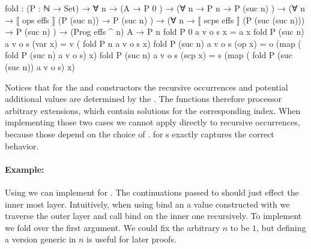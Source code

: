 \begin{code}
fold : (P : ℕ → Set) → ∀ n →
  (A                                           → P 0        )  →
  (∀ {n} → P n                                 → P (suc n)  )  →
  (∀ {n} → ⟦ ops   effs  ⟧  (P (suc n))        → P (suc n)  )  →
  (∀ {n} → ⟦ scps  effs  ⟧  (P (suc (suc n)))  → P (suc n)  )  →
  (Prog effs ^ n) A → P n
fold P 0        a v o s x         = a  x
fold P (suc n)  a v o s (var  x)  = v  (       fold P n              a v o s   x)
fold P (suc n)  a v o s (op   x)  = o  (map (  fold P (suc n)        a v o s)  x)
fold P (suc n)  a v o s (scp  x)  = s  (map (  fold P (suc (suc n))  a v o s)  x)
\end{code}
Notices that for the  and
 constructors the recursive occurrences and
potential additional values are determined by the .
The functions therefore processor arbitrary  extensions,
which contain solutions for the corresponding index.
When implementing those two cases we cannot apply  directly
to recursive occurrences, because those depend on the choice of
.
 for s exactly captures the correct
behavior.

\paragraph{Example: \bind{}}
Using  we can implement \AgdaFunction{>>=} for
\AgdaSpace{}\AgdaSpace{}.
The continuations  passed to \AgdaFunction{>>=} should just
effect the inner most layer.
Intuitively, when using bind an a value constructed with
 we traverse the outer layer and call bind on the
inner one recursively.
To implement \AgdaFunction{>>=} we fold over the first argument.
We could fix the arbitrary $n$ to be $1$, but defining a version generic in $n$
is useful for later proofs.


